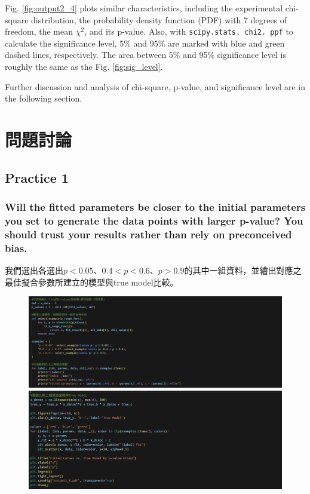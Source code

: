 \documentclass[12pt,a4paper]{article}
\begin{document}
\begin{CJK}{UTF8}{bkai}
Fig. \ref{fig:output2_4} plots similar characteristics, including the experimental chi-square distribution, the probability density function (PDF) with 7 degrees of freedom, the mean $\chi^2$, and its p-value. Also, with \texttt{scipy.stats. chi2. ppf} to calculate the significance level, 5\% and 95\% are marked with blue and green dashed lines, respectively. The area between 5\% and 95\%  significance level is roughly the same as the Fig. \ref{fig:sig_level}.

Further discussion and analysis of chi-square, p-value, and significance level are in the following section.

\clearpage
\section{問題討論}
\subsection{Practice 1}\label{subsec:discuss_1}

\subsubsection{Will the fitted parameters be closer to the initial parameters you set to generate the data points with larger \textbf{p-value}? You should trust your results rather than rely on preconceived bias.}
\hfill

我們選出各選出$p<0.05$、$0.4<p<0.6$、$p>0.9$的其中一組資料，並繪出對應之最佳擬合參數所建立的模型與true model比較。

\begin{figure}[h]
    \centering
    \includegraphics[width=1\linewidth]{figures/RF/practice_1_QA_1.png}    \includegraphics[width=1\linewidth]{figures/RF/practice_1_QA_2.png}
    \label{fig:code_p1QA}
\end{figure}


\end{CJK}
\end{document}
